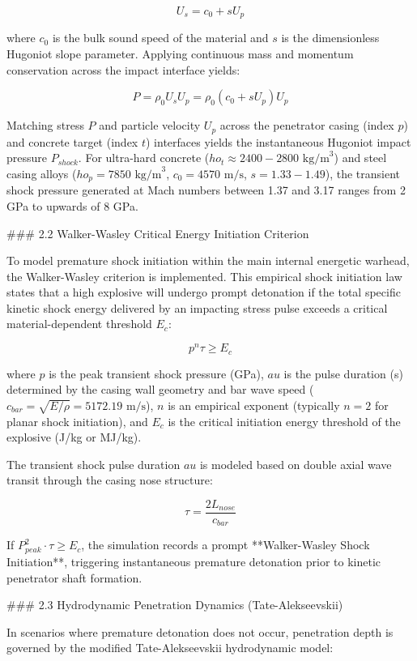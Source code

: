 $$U_s = c_0 + s U_p$$

where $c_0$ is the bulk sound speed of the material and $s$ is the dimensionless Hugoniot slope parameter. Applying continuous mass and momentum conservation across the impact interface yields:

$$P = \rho_0 U_s U_p = \rho_0 (c_0 + s U_p) U_p$$

Matching stress $P$ and particle velocity $U_p$ across the penetrator casing (index $p$) and concrete target (index $t$) interfaces yields the instantaneous Hugoniot impact pressure $P_{shock}$. For ultra-hard concrete ($
ho_t \approx 2400-2800\text{ kg/m}^3$) and steel casing alloys ($
ho_p = 7850\text{ kg/m}^3$, $c_0 = 4570\text{ m/s}$, $s = 1.33-1.49$), the transient shock pressure generated at Mach numbers between 1.37 and 3.17 ranges from 2 GPa to upwards of 8 GPa.

### 2.2 Walker-Wasley Critical Energy Initiation Criterion

To model premature shock initiation within the main internal energetic warhead, the Walker-Wasley criterion is implemented. This empirical shock initiation law states that a high explosive will undergo prompt detonation if the total specific kinetic shock energy delivered by an impacting stress pulse exceeds a critical material-dependent threshold $E_c$:

$$p^n \tau \ge E_c$$

where $p$ is the peak transient shock pressure (GPa), $	au$ is the pulse duration (\mu s) determined by the casing wall geometry and bar wave speed ($c_{bar} = \sqrt{E/\rho} = 5172.19\text{ m/s}$), $n$ is an empirical exponent (typically $n = 2$ for planar shock initiation), and $E_c$ is the critical initiation energy threshold of the explosive (J/kg or MJ/kg).

The transient shock pulse duration $	au$ is modeled based on double axial wave transit through the casing nose structure:

$$\tau = \frac{2 L_{nose}}{c_{bar}}$$

If $P_{peak}^2 \cdot \tau \ge E_c$, the simulation records a prompt **Walker-Wasley Shock Initiation**, triggering instantaneous premature detonation prior to kinetic penetrator shaft formation.

### 2.3 Hydrodynamic Penetration Dynamics (Tate-Alekseevskii)

In scenarios where premature detonation does not occur, penetration depth is governed by the modified Tate-Alekseevskii hydrodynamic model:


